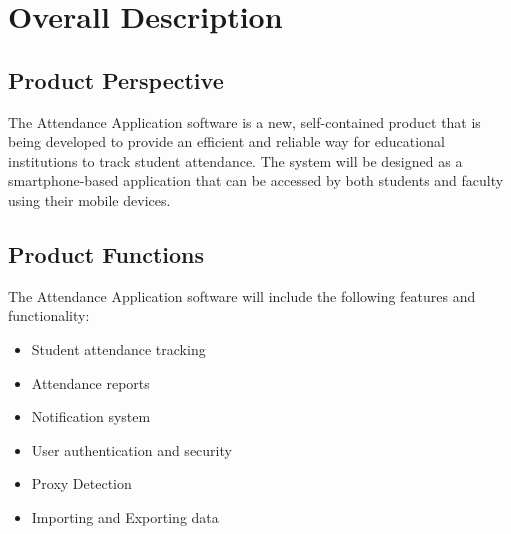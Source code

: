 \documentclass{scrreprt}
\begin{document}
\chapter{Overall Description}

\section{Product Perspective}
The Attendance Application software is a new, self-contained product that is being developed to provide an efficient and reliable way for educational institutions to track student attendance. The system will be designed as a smartphone-based application that can be accessed by both students and faculty using their mobile devices.


\section{Product Functions}
The Attendance Application software will include the following features and functionality:
\begin{multicols}{2}
    \begin{itemize}
        \item Student attendance tracking
        \vspace{-4pt}
        \item Attendance reports
        \vspace{-4pt}
        \item Notification system
        \vspace{-4pt}
        \item User authentication and security
        \vspace{-4pt}
        \item Proxy Detection
        \vspace{-4pt}
        \item Importing and Exporting data
    \end{itemize}
\end{multicols}

\end{document}
